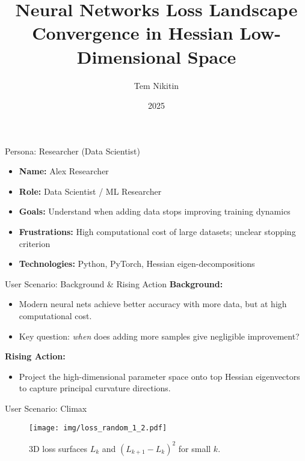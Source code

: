 \documentclass{beamer}
\title[Loss Landscape Convergence]{Neural Networks Loss Landscape Convergence in Hessian Low-Dimensional Space}
\author[Tem Nikitin \textit{et al.}]{Tem Nikitin}
\institute{Moscow Institute of Physics and Technology}
\date{2025}
\begin{document}
\begin{frame}
    \thispagestyle{empty}
    \maketitle
\end{frame}

\begin{frame}{Persona: Researcher (Data Scientist)}
    \begin{itemize}
        \item \textbf{Name:} Alex Researcher
        \item \textbf{Role:} Data Scientist / ML Researcher
        \item \textbf{Goals:} Understand when adding data stops improving training dynamics
        \item \textbf{Frustrations:} High computational cost of large datasets; unclear stopping criterion
        \item \textbf{Technologies:} Python, PyTorch, Hessian eigen-decompositions
    \end{itemize}
\end{frame}

\begin{frame}{User Scenario: Background \& Rising Action}
    \textbf{Background:}
    \begin{itemize}
        \item Modern neural nets achieve better accuracy with more data, but at high computational cost.
        \item Key question: \emph{when} does adding more samples give negligible improvement?
    \end{itemize}
    \textbf{Rising Action:}
    \begin{itemize}
        \item Project the high-dimensional parameter space onto top Hessian eigenvectors to capture principal curvature directions.
    \end{itemize}
\end{frame}

\begin{frame}{User Scenario: Climax}
    \begin{figure}
        \centering
        \texttt{[image: img/loss\_random\_1\_2.pdf]}
        \caption*{3D loss surfaces $L_k$ and $(L_{k+1}-L_k)^2$ for small $k$.}
    \end{figure}
\end{frame}
\end{document}
